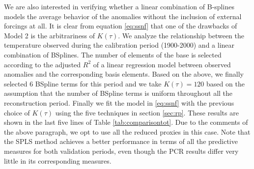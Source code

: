 \documentclass[11pt]{amsart}
\theoremstyle{plain}
\theoremstyle{definition}
\theoremstyle{remark}
\begin{document}
We are also interested in verifying whether a linear combination of B-splines
models the average behavior of the anomalies without the inclusion of external
forcings at all. It is clear from equation \eqref{eq:ssnf} that one of the
drawbacks of Model 2 is the arbitrariness of $K(\tau)$. We analyze the
relationship between the temperature observed during the calibration period
(1900-2000) and a linear combination of BSplines. The number of elements of the
base is selected according to the adjusted $R^2$ of a linear regression model between observed anomalies and
the corresponding basis elements. Based on the above, we finally selected 6
BSpline terms for this period and we take $K(\tau)=120$ based on the
assumption that the number of BSpline terms is uniform
throughout all the reconstruction period. Finally we fit the model in
\eqref{eq:ssnf} with the previous choice of $K(\tau)$ using the five techniques
in section \ref{sec:rp}. These results are
shown in the last five lines of Table \ref{tab:comparisontot}. Due to the comments of the above paragraph, we opt to
use all the reduced proxies in this case.
Note that the SPLS method achieves a better performance in terms of all the
predictive measures for both validation periods, even though the PCR results
differ very little in its corresponding measures. 
\end{document}
